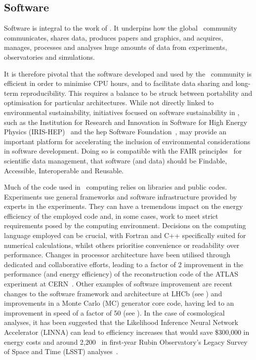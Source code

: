 \documentclass[../SustainableHEP.tex]{subfiles}
\begin{document}

\subsection{Software}\label{subsec:software}

Software is integral to the work of \ACR. It underpins how the global \ACR\ community communicates, shares data, produces papers and graphics, and acquires, manages, processes and analyses huge amounts of data from experiments, observatories and simulations.

It is therefore pivotal that the software developed and used by the \ACR\ community is efficient in order to minimise CPU hours, and to facilitate data sharing and long-term reproducibility. This requires a balance to be struck between portability and optimisation for particular architectures.  While not directly linked to environmental sustainability, initiatives focused on software sustainability in \ACR, such as the Institution for Research and Innovation in Software for High Energy Physics (IRIS-HEP)~\cite{IRISHEP} and the \acrshort{hep} Software Foundation~\cite{HSF}, may provide an important platform for accelerating the inclusion of  environmental considerations in software development. Doing so is compatible with the FAIR principles~\cite{FAIR} for scientific data management, that software (and data) should be Findable, Accessible, Interoperable and Reusable.

Much of the code used in \ACR\ computing relies on libraries and public codes. Experiments use general frameworks and software infrastructure provided by experts in the experiments. They can have a tremendous impact on the energy efficiency of the employed code and, in some cases, work to meet strict requirements posed by the computing environment. Decisions on the computing language employed can be crucial, with Fortran and C++ specifically suited for numerical calculations, whilst others prioritise convenience or readability over performance.  Changes in processor architecture have been utilised through dedicated and collaborative  efforts, leading to a factor of 2 improvement in the performance (and energy efficiency) of the reconstruction code of the ATLAS experiment at CERN~\cite{ATL-SOFT-PUB-2021-002}. Other examples of software improvement are recent changes to the software framework and architecture at LHCb (see ) and improvements in a Monte Carlo (MC) generator core code, having led to an improvement in speed of a factor of 50 (see ).  In the case of cosmological analyses, it has been suggested that the Likelihood Inference Neural Network Accelerator (LINNA) can lead to efficiency increases that would save  \$300,000 in energy costs and around 2,200 \tCdO\ in first-year Rubin Observatory's Legacy Survey of Space and Time (LSST) analyses~\cite{To:2022ubu}.
\end{document}
